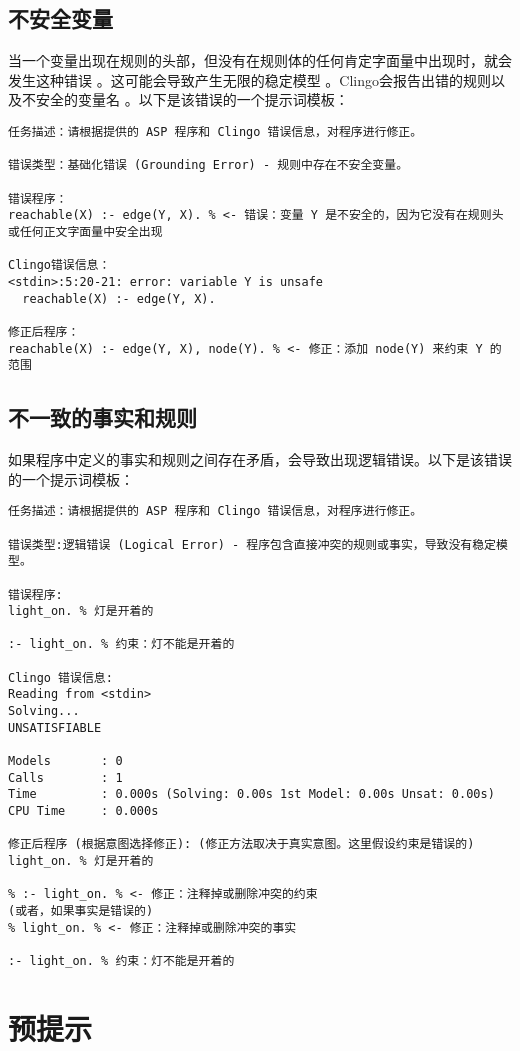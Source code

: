 \subsection{不安全变量}
当一个变量出现在规则的头部，但没有在规则体的任何肯定字面量中出现时，就会发生这种错误 。这可能会导致产生无限的稳定模型 。Clingo会报告出错的规则以及不安全的变量名 。以下是该错误的一个提示词模板：
\begin{lstlisting}
任务描述：请根据提供的 ASP 程序和 Clingo 错误信息，对程序进行修正。

错误类型：基础化错误 (Grounding Error) - 规则中存在不安全变量。

错误程序：
reachable(X) :- edge(Y, X). % <- 错误：变量 Y 是不安全的，因为它没有在规则头或任何正文字面量中安全出现

Clingo错误信息：
<stdin>:5:20-21: error: variable Y is unsafe
  reachable(X) :- edge(Y, X).

修正后程序：
reachable(X) :- edge(Y, X), node(Y). % <- 修正：添加 node(Y) 来约束 Y 的范围
\end{lstlisting}
\subsection{不一致的事实和规则}
如果程序中定义的事实和规则之间存在矛盾，会导致出现逻辑错误。以下是该错误的一个提示词模板：
\begin{lstlisting}
任务描述：请根据提供的 ASP 程序和 Clingo 错误信息，对程序进行修正。

错误类型:逻辑错误 (Logical Error) - 程序包含直接冲突的规则或事实，导致没有稳定模型。

错误程序:
light_on. % 灯是开着的

:- light_on. % 约束：灯不能是开着的

Clingo 错误信息:
Reading from <stdin>
Solving...
UNSATISFIABLE

Models       : 0
Calls        : 1
Time         : 0.000s (Solving: 0.00s 1st Model: 0.00s Unsat: 0.00s)
CPU Time     : 0.000s

修正后程序 (根据意图选择修正): (修正方法取决于真实意图。这里假设约束是错误的)
light_on. % 灯是开着的

% :- light_on. % <- 修正：注释掉或删除冲突的约束
(或者，如果事实是错误的)
% light_on. % <- 修正：注释掉或删除冲突的事实

:- light_on. % 约束：灯不能是开着的
\end{lstlisting}
\section{预提示}
\label{appendix:preprompt}
